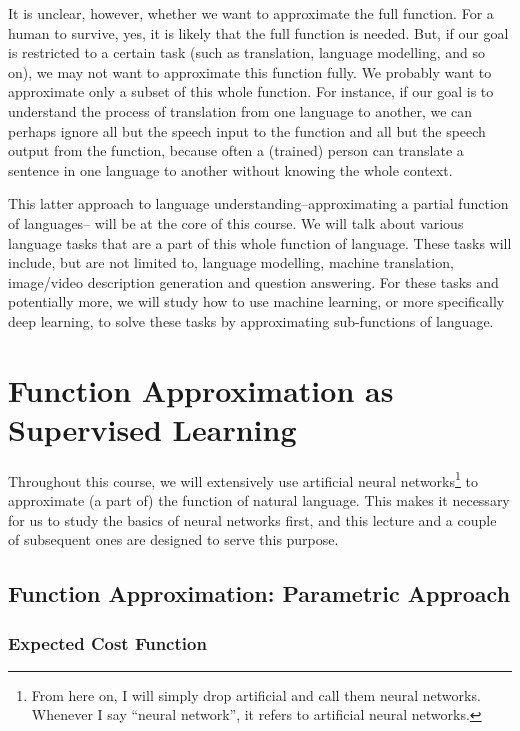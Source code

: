 \documentclass{report}
\begin{document}
It is unclear, however, whether we want to approximate the full function. For a
human to survive, yes, it is likely that the full function is needed. But, if
our goal is restricted to a certain task (such as translation, language
modelling, and so on), we may not want to approximate this function fully. We
probably want to approximate only a subset of this whole function. For instance,
if our goal is to understand the process of translation from one language to
another, we can perhaps ignore all but the speech input to the function and all
but the speech output from the function, because often a (trained) person can
translate a sentence in one language to another without knowing the whole
context.

This latter approach to language understanding--approximating a partial function
of languages-- will be at the core of this course. We will talk about various
language tasks that are a part of this whole function of language. These tasks
will include, but are not limited to, language modelling, machine translation,
image/video description generation and question answering. For these tasks and
potentially more, we will study how to use machine learning, or more
specifically deep learning, to solve these tasks by approximating sub-functions
of language.


\chapter{Function Approximation as Supervised Learning}
\label{chap:function_approx}

Throughout this course, we will extensively use artificial neural
networks\footnote{
    From here on, I will simply drop artificial and call them neural networks.
    Whenever I say ``neural network'', it refers to artificial neural networks.
}
to approximate (a part of) the function of natural language. This makes it
necessary for us to study the basics of neural networks first, and this lecture
and a couple of subsequent ones are designed to serve this purpose.

\section{Function Approximation: Parametric Approach}

\subsection{Expected Cost Function}
\end{document}

